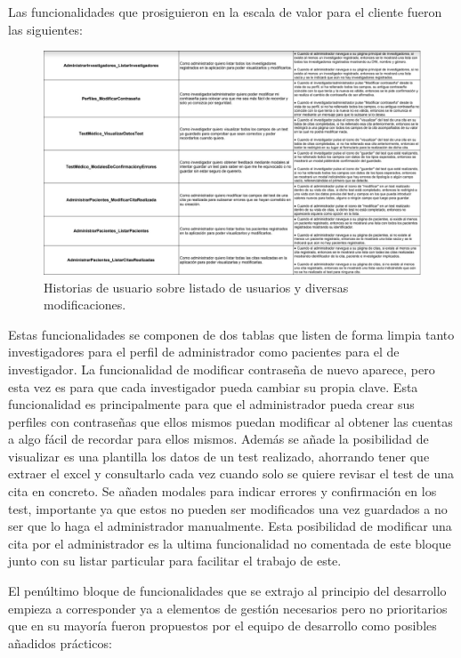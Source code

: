 Las funcionalidades que prosiguieron en la escala de valor para el cliente fueron las siguientes:
\newline

 \begin{figure}[h]
    \centering
     \includegraphics[width=1\textwidth]{images/historiasUsuario-3.jpg}
    \caption{Historias de usuario sobre listado de usuarios y diversas modificaciones.}
\end{figure}


Estas funcionalidades se componen de dos tablas que listen de forma limpia tanto investigadores para el perfil de administrador como pacientes para el de investigador. La funcionalidad de modificar contraseña de nuevo aparece, pero esta vez es para que cada investigador pueda cambiar su propia clave. Esta funcionalidad es principalmente para que el administrador pueda crear sus perfiles con contraseñas que ellos mismos puedan modificar al obtener las cuentas a algo fácil de recordar para ellos mismos. Además se añade la posibilidad de visualizar es una plantilla los datos de un test realizado, ahorrando tener que extraer el excel y consultarlo cada vez cuando solo se quiere revisar el test de una cita en concreto. Se añaden modales para indicar errores y confirmación en los test, importante ya que estos no pueden ser modificados una vez guardados a no ser que lo haga el administrador manualmente. Esta posibilidad de modificar una cita por el administrador es la ultima funcionalidad no comentada de este bloque junto con su listar particular para facilitar el trabajo de este.
\newpage

El penúltimo bloque de funcionalidades que se extrajo al principio del desarrollo empieza a corresponder ya a elementos de gestión necesarios pero no prioritarios que en su mayoría fueron propuestos por el equipo de desarrollo como posibles añadidos prácticos:
\newline

